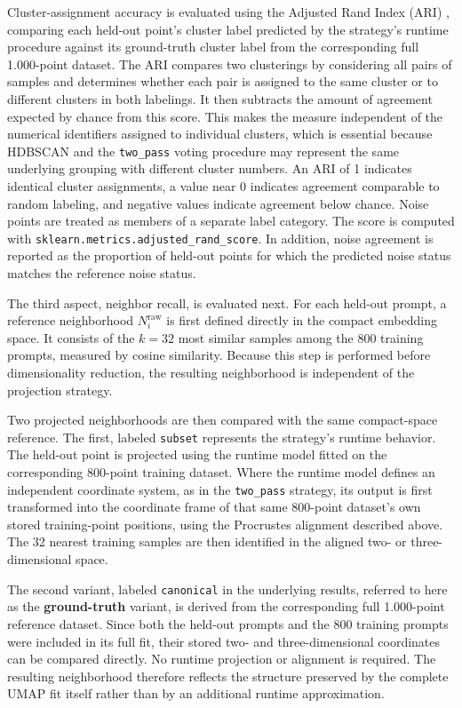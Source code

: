 Cluster-assignment accuracy is evaluated using the Adjusted Rand Index (ARI) \cite{hubert_comparing_1985}, comparing each held-out point's cluster label predicted by the strategy's runtime procedure against its ground-truth cluster label from the corresponding full 1.000-point dataset. The ARI compares two clusterings by considering all pairs of samples and determines whether each pair is assigned to the same cluster or to different clusters in both labelings. It then subtracts the amount of agreement expected by chance from this score. This makes the measure independent of the numerical identifiers assigned to individual clusters, which is essential because HDBSCAN and the \texttt{two\_pass} voting procedure may represent the same underlying grouping with different cluster numbers. An ARI of 1 indicates identical cluster assignments, a value near 0 indicates agreement comparable to random labeling, and negative values indicate agreement below chance. Noise points are treated as members of a separate label category. The score is computed with \texttt{sklearn.metrics.adjusted\_rand\_score}. In addition, noise agreement is reported as the proportion of held-out points for which the predicted noise status matches the reference noise status.

The third aspect, neighbor recall, is evaluated next. For each held-out prompt, a reference neighborhood $N_i^{\text{raw}}$ is first defined directly in the compact embedding space. It consists of the $k = 32$ most similar samples among the 800 training prompts, measured by cosine similarity. Because this step is performed before dimensionality reduction, the resulting neighborhood is independent of the projection strategy.

Two projected neighborhoods are then compared with the same compact-space reference. The first, labeled \texttt{subset} represents the strategy's runtime behavior. The held-out point is projected using the runtime model fitted on the corresponding 800-point training dataset. Where the runtime model defines an independent coordinate system, as in the \texttt{two\_pass} strategy, its output is first transformed into the coordinate frame of that same 800-point dataset's own stored training-point positions, using the Procrustes alignment described above. The 32 nearest training samples are then identified in the aligned two- or three-dimensional space.

The second variant, labeled \texttt{canonical} in the underlying results, referred to here as the \textbf{ground-truth} variant, is derived from the corresponding full 1.000-point reference dataset. Since both the held-out prompts and the 800 training prompts were included in its full fit, their stored two- and three-dimensional coordinates can be compared directly. No runtime projection or alignment is required. The resulting neighborhood therefore reflects the structure preserved by the complete UMAP fit itself rather than by an additional runtime approximation.

